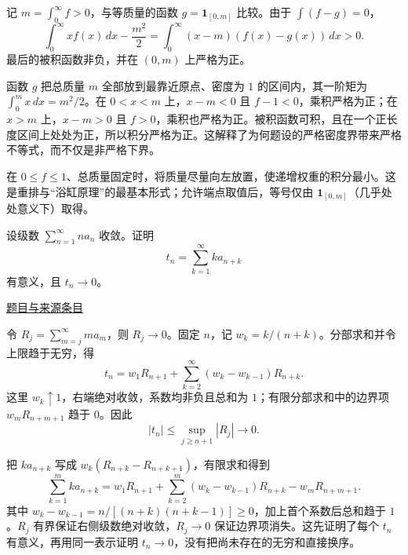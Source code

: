 \documentclass[UTF8,12pt,a4paper,fontset=fandol]{ctexart}
\begin{document}
\begin{solve}\label{ans:fin02-all:2}

记 $m=\int_0^\infty f>0$，与等质量的函数 $g=\boldsymbol1_{[0,m]}$ 比较。由于 $\int(f-g)=0$，
\[
\int_0^\infty xf(x)\,dx-\frac{m^2}{2}
=\int_0^\infty(x-m)(f(x)-g(x))\,dx>0.
\]
最后的被积函数非负，并在 $(0,m)$ 上严格为正。

函数 $g$ 把总质量 $m$ 全部放到最靠近原点、密度为 $1$ 的区间内，其一阶矩为 $\int_0^m x\,dx=m^2/2$。在 $0<x<m$ 上，$x-m<0$ 且 $f-1<0$，乘积严格为正；在 $x>m$ 上，$x-m>0$ 且 $f>0$，乘积也严格为正。被积函数可积，且在一个正长度区间上处处为正，所以积分严格为正。这解释了为何题设的严格密度界带来严格不等式，而不仅是非严格下界。

\end{solve}

\begin{remark}[方法与条件]在 $0\le f\le1$、总质量固定时，将质量尽量向左放置，使递增权重的积分最小。这是重排与“浴缸原理”的最基本形式；允许端点取值后，等号仅由 $\boldsymbol1_{[0,m]}$（几乎处处意义下）取得。\end{remark}

\begin{example}[来源序号3]\label{ex:fin02-all:3}\label{pr:fin02-all:3}

设级数 $\sum_{n=1}^\infty na_n$ 收敛。证明
\[
t_n=\sum_{k=1}^\infty ka_{n+k}
\]
有意义，且 $t_n\to0$。

\par\href{https://github.com/lzxcr/cmc-mathematics/blob/64916fa1fdbc3e444a652eca204d5669058ee321/src/problems/finals/02/03.md}{题目与来源条目}

\end{example}

\begin{solve}\label{ans:fin02-all:3}

令 $R_j=\sum_{m=j}^\infty ma_m$，则 $R_j\to0$。固定 $n$，记 $w_k=k/(n+k)$。分部求和并令上限趋于无穷，得
\[
t_n=w_1R_{n+1}+\sum_{k=2}^\infty(w_k-w_{k-1})R_{n+k}.
\]
这里 $w_k\uparrow1$，右端绝对收敛，系数均非负且总和为 $1$；有限分部求和中的边界项 $w_mR_{n+m+1}$ 趋于 $0$。因此
\[
|t_n|\le\sup_{j\ge n+1}|R_j|\longrightarrow0.
\]

把 $ka_{n+k}$ 写成 $w_k(R_{n+k}-R_{n+k+1})$，有限求和得到
\[
\sum_{k=1}^mka_{n+k}=w_1R_{n+1}+\sum_{k=2}^m(w_k-w_{k-1})R_{n+k}-w_mR_{n+m+1}.
\]
其中 $w_k-w_{k-1}=n/[(n+k)(n+k-1)]\ge0$，加上首个系数后总和趋于 $1$。$R_j$ 有界保证右侧级数绝对收敛，$R_j\to0$ 保证边界项消失。这先证明了每个 $t_n$ 有意义，再用同一表示证明 $t_n\to0$，没有把尚未存在的无穷和直接换序。

\end{solve}
\end{document}
